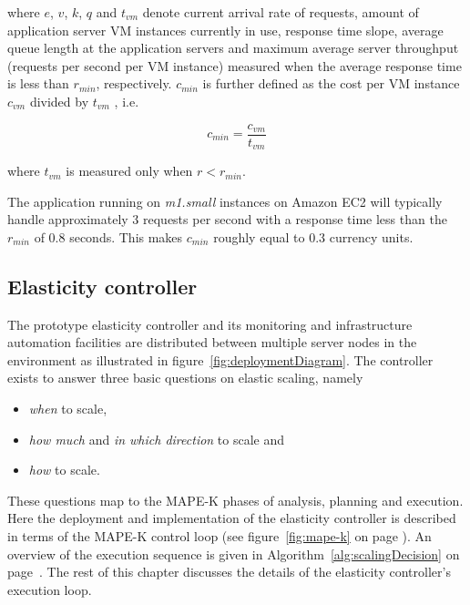 \documentclass[english]{tktltiki2}
\theoremstyle{definition}
\theoremstyle{remark}
\begin{document}
where $e$, $v$, $k$, $q$ and $t_{vm}$ denote current arrival rate of requests,
amount of application server VM instances currently in use, response time slope,
average queue length at the application servers and maximum average
server throughput (requests per second per VM instance) measured when the average
response time is less than $r_{min}$, respectively. $c_{min}$ is further defined
as the cost per VM instance $c_{vm}$ divided by $t_{vm}$ , i.e.

\begin{equation}
	c_{min} = 
	\frac{c_{vm}}{t_{vm}} 
	\label{eq:costMin}
\end{equation}

where $t_{vm}$ is measured only when $r < r_{min}$. 

The application running on \textit{m1.small} instances on Amazon EC2 will
typically handle approximately 3 requests per second with a response time less
than the $r_{min}$ of 0.8 seconds. This makes $c_{min}$
roughly equal to 0.3 currency units.

\subsection{Elasticity controller}

The prototype elasticity controller and its monitoring and infrastructure automation facilities are distributed between multiple server nodes
in the environment as illustrated in figure~\ref{fig:deploymentDiagram}. The controller exists to answer three basic questions on
elastic scaling, namely 
\begin{itemize}
	\item{\textit{when} to scale,}
	\item{\textit{how much} and \textit{in which direction} to scale and}
  	\item{\textit{how} to scale}.
\end{itemize}

These questions map to the MAPE-K phases of analysis, planning and execution.
Here the deployment and implementation of the elasticity controller is
described in terms of the MAPE-K control loop (see figure~\ref{fig:mape-k} on
page \pageref{fig:mape-k}). An overview of the execution sequence is given in
Algorithm~\ref{alg:scalingDecision} on page~\pageref{alg:scalingDecision}. The rest of this chapter discusses the
details of the elasticity controller's execution loop.
\end{document}
